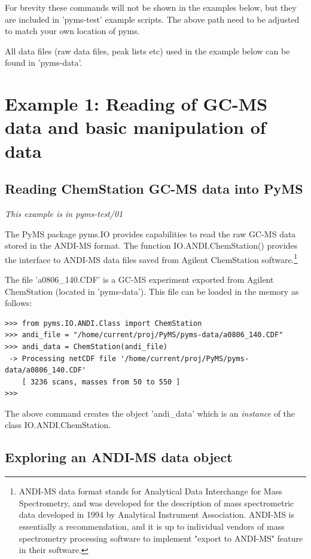 For brevity these commands will not be shown in the examples below, but
they are included in 'pyms-test' example scripts.  The above path need
to be adjusted to match your own location of pyms.

All data files (raw data files, peak lists etc) used in the example below
can be found in 'pyms-data'.


\section{Example 1: Reading of GC-MS data and basic manipulation of
data}

\subsection{Reading ChemStation GC-MS data into PyMS}

\noindent
{\em This example is in pyms-test/01}

The PyMS package pyms.IO provides capabilities to read the raw GC-MS
data stored in the ANDI-MS format. The function IO.ANDI.ChemStation()
provides the interface to ANDI-MS data files saved from Agilent
ChemStation software.\footnote{ANDI-MS data format stands for Analytical
Data Interchange for Mass Spectrometry, and was developed for the
description of mass spectrometric data developed in 1994 by Analytical
Instrument Association. ANDI-MS is essentially a recommendation, and
it is up to individual vendors of mass spectrometry processing software
to implement "export to ANDI-MS" feature in their software.}

The file 'a0806\_140.CDF' is a GC-MS experiment exported from Agilent
ChemStation (located in 'pyms-data'). This file can be loaded in the
memory as follows:

\begin{verbatim}
>>> from pyms.IO.ANDI.Class import ChemStation
>>> andi_file = "/home/current/proj/PyMS/pyms-data/a0806_140.CDF"
>>> andi_data = ChemStation(andi_file)
 -> Processing netCDF file '/home/current/proj/PyMS/pyms-data/a0806_140.CDF'
    [ 3236 scans, masses from 50 to 550 ]
>>>
\end{verbatim}

\noindent
The above command creates the object 'andi\_data' which is an {\em instance}
of the class IO.ANDI.ChemStation.

\subsection{Exploring an ANDI-MS data object}

